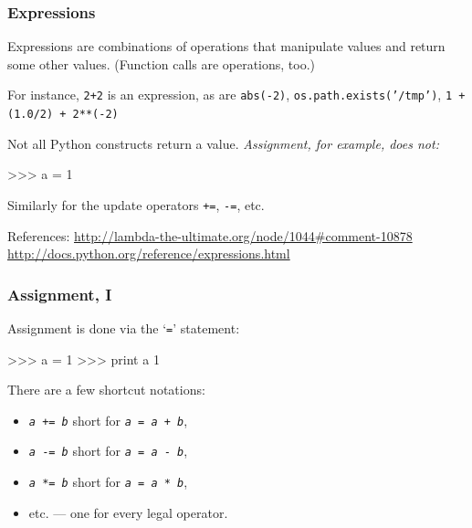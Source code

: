 \documentclass[english,serif,mathserif,xcolor=pdftex,dvipsnames,table]{beamer}
\begin{document}
\begin{frame}[fragile]
  \frametitle{Expressions}

  Expressions are combinations of operations that manipulate values
  and return some other values.  (Function calls are operations, too.)

  \+
  For instance, \texttt{2+2} is an expression, as are
  \texttt{abs(-2)}, \texttt{os.path.exists('/tmp')},
  \texttt{1 + (1.0/2) + 2**(-2)}

  \+
  Not all Python constructs return a value.
  \emph{Assignment, for example, does not:}
\begin{semiverbatim}
>>> a = 1
\end{semiverbatim}
  Similarly for the update operators \texttt{+=}, \texttt{-=}, etc.

  \+\scriptsize
  References:
  \url{http://lambda-the-ultimate.org/node/1044#comment-10878}
  \url{http://docs.python.org/reference/expressions.html}

\end{frame}


\begin{frame}[fragile]
  \frametitle{Assignment, I}
  Assignment is done via the `\texttt{=}' statement:
\begin{semiverbatim}
>>> a = 1
>>> print a
1
\end{semiverbatim}

  \+
  There are a few shortcut notations:
  \begin{itemize}
  \item[] \texttt{\emph{a} += \emph{b}} short for \texttt{\emph{a} = \emph{a} + \emph{b}},
  \item[] \texttt{\emph{a} -= \emph{b}} short for \texttt{\emph{a} = \emph{a} - \emph{b}},
  \item[] \texttt{\emph{a} *= \emph{b}} short for \texttt{\emph{a} = \emph{a} * \emph{b}},
  \item[]   etc. --- one for every legal operator.
  \end{itemize}
\end{frame}
\end{document}
